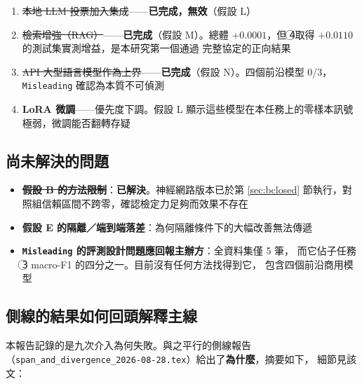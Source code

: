 \documentclass[11pt,a4paper]{ctexart}
\newcommand{\fn}[1]{\texttt{#1}}
\begin{document}
\begin{enumerate}[leftmargin=2em, itemsep=2pt]
  \item \sout{本地 LLM 投票加入集成}——\textbf{已完成，無效}（假設 L）
  \item \sout{檢索增強（RAG）}——\textbf{已完成}（假設 M）。總體 $+0.0001$，但
        \textcircled{4}取得 $\mathbf{+0.0110}$ 的測試集實測增益，是本研究第一個通過
        完整協定的正向結果
  \item \sout{API 大型語言模型作為上界}——\textbf{已完成}（假設 N）。四個前沿模型
        0/3，\fn{Misleading} 確認為本質不可偵測
  \item \textbf{LoRA 微調}——優先度下調。假設 L 顯示這些模型在本任務上的零樣本訊號
        極弱，微調能否翻轉存疑
\end{enumerate}

\subsection{尚未解決的問題}

\begin{itemize}[leftmargin=2em, itemsep=1pt]
  \item \sout{\textbf{假設 B 的方法限制}}：\textbf{已解決}。神經網路版本已於第
        \ref{sec:bclosed} 節執行，對照組信賴區間不跨零，確認檢定力足夠而效果不存在
  \item \textbf{假設 E 的隔離／端到端落差}：為何隔離條件下的大幅改善無法傳遞
  \item \textbf{\fn{Misleading} 的評測設計問題應回報主辦方}：全資料集僅 5 筆，
        而它佔子任務\textcircled{3} macro-F1 的四分之一。目前沒有任何方法找得到它，
        包含四個前沿商用模型
\end{itemize}

\subsection{側線的結果如何回頭解釋主線}

本報告記錄的是九次介入為何失敗。與之平行的側線報告
（\texttt{span\_and\_divergence\_2026-08-28.tex}）給出了\textbf{為什麼}，摘要如下，
細節見該文：
\end{document}

